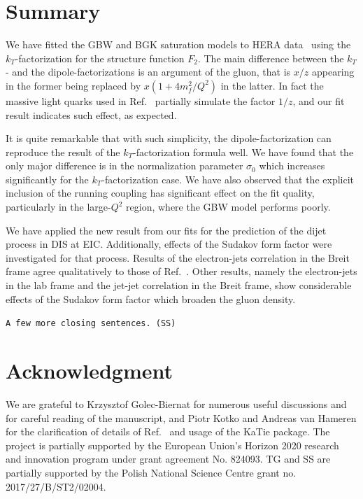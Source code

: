 \documentclass[11pt]{article}
\newcommand{\comment}[1]{\texttt{\color{red}#1}}
\begin{document}
\section{Summary}

We have fitted the GBW and BGK saturation models to HERA data~\cite{Abt:2017nkc}
using the $k_T$-factorization for the structure function $F_2$.  The main
difference between the $k_T$- and the dipole-factorizations is an argument of
the gluon, that is $x/z$ appearing in the former being replaced by
$x(1+4m_f^2/Q^2)$ in the latter. 
%
In fact the massive light quarks used in
Ref.~\cite{Golec-Biernat:1998zce} partially simulate the factor $1/z$, and our 
fit result indicates such effect, as expected. 
 
It is quite remarkable that with such simplicity, the dipole-factorization can
reproduce the result of the $k_T$-factorization formula well. We have found that
the only major difference is in the normalization parameter $\sigma_0$ which
increases significantly for the $k_T$-factorization case. We have also observed
that the explicit inclusion of the running coupling has significant effect on
the fit quality, particularly in the large-$Q^2$ region, where the GBW model
performs poorly. 

We have applied the new result from our fits for the prediction of the dijet
process in DIS at EIC. Additionally, effects of the Sudakov form factor were
investigated for that process. Results of the electron-jets correlation in the
Breit frame agree qualitatively to those of Ref.~\cite{vanHameren:2021sqc}.
Other results, namely the electron-jets in the lab frame and the jet-jet
correlation in the Breit frame, show considerable effects of the Sudakov form
factor which broaden the gluon density.  

\comment{A few more closing sentences. (SS)}


\section*{Acknowledgment}
We are grateful to Krzysztof Golec-Biernat for numerous useful discussions and
for careful reading of the manuscript, and Piotr Kotko and Andreas van Hameren
for the clarification of details of Ref.~\cite{vanHameren:2021sqc} and 
usage of the KaTie package. The project is partially supported by the European
Union’s Horizon 2020 research and innovation program under grant agreement No.
824093.  TG and SS are partially supported by the Polish National Science Centre
grant no. 2017/27/B/ST2/02004.
\end{document}

